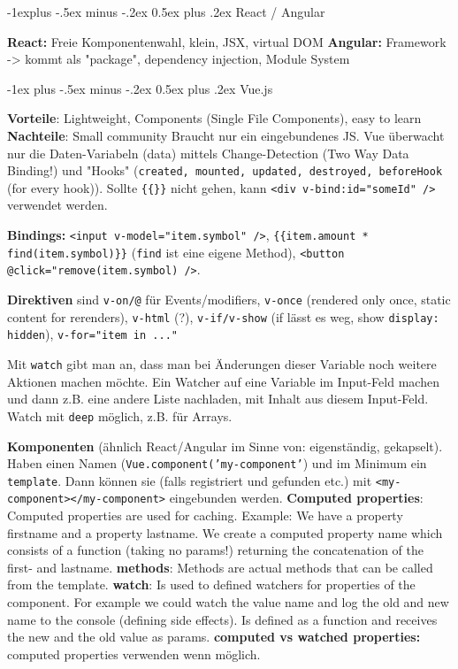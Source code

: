 \documentclass[a4paper, fontsize=6pt]{scrartcl}
\makeatletter
\renewcommand{\section}{\@startsection{section}{1}{0mm}%
    {-1ex plus -.5ex minus -.2ex}%
    {0.5ex plus .2ex}%
    {\normalfont\large\bfseries}}
\renewcommand{\subsection}{\@startsection{subsection}{2}{0mm}%
    {-1explus -.5ex minus -.2ex}%
    {0.5ex plus .2ex}%
    {\normalfont\normalsize\bfseries}}
\newcommand{\css}[1]{\texttt{#1}}
\newcommand{\html}[1]{\texttt{#1}}
\newcommand{\js}[1]{\texttt{#1}}
\makeatother
\begin{document}
\begin{multicols*}{5}
\subsection{React / Angular}

\textbf{React:} Freie Komponentenwahl, klein, JSX, virtual DOM
\textbf{Angular:} Framework -> kommt als "package", dependency injection, Module System

\section{Vue.js}

\textbf{Vorteile}: Lightweight, Components (Single File Components), easy to learn \textbf{Nachteile}: Small community
Braucht nur ein eingebundenes JS. Vue überwacht nur die Daten-Variabeln (data) mittels Change-Detection (Two Way Data Binding!) und "Hooks" (\js{created, mounted, updated, destroyed, beforeHook} (for every hook)). Sollte \html{\{\{\}\}} nicht gehen, kann \html{<div v-bind:id="someId" />} verwendet werden.

\textbf{Bindings:} \html{<input v-model="item.symbol" />}, \html{\{\{item.amount * find(item.symbol)\}\}} (\js{find} ist eine eigene Method), \html{<button @click="remove(item.symbol) />}.

\textbf{Direktiven} sind \html{v-on/@} für Events/modifiers, \html{v-once} (rendered only once, static content for rerenders), \html{v-html} (?), \html{v-if/v-show} (if lässt es weg, show \css{display: hidden}), \html{v-for="item in ..."}

Mit \js{watch} gibt man an, dass man bei Änderungen dieser Variable noch weitere Aktionen machen möchte. Ein Watcher auf eine Variable im Input-Feld machen und dann z.B. eine andere Liste nachladen, mit Inhalt aus diesem Input-Feld. Watch mit \js{deep} möglich, z.B. für Arrays.

\textbf{Komponenten} (ähnlich React/Angular im Sinne von: eigenständig, gekapselt). Haben einen Namen (\js{Vue.component('my-component'}) und im Minimum ein \js{template}. Dann können sie (falls registriert und gefunden etc.) mit \html{<my-component></my-component>} eingebunden werden.
\textbf{Computed properties}: Computed properties are used for caching. Example: We have a property firstname and a property lastname. We create a computed property name which consists of a function (taking no params!) returning the concatenation of the first- and lastname. 
\textbf{methods}: Methods are actual methods that can be called from the template.
\textbf{watch}: Is used to defined watchers for properties of the component. For example we could watch the value name and log the old and new name to the console (defining side effects). Is defined as a function and receives the new and the old value as params.
\textbf{computed vs watched properties:} computed properties verwenden wenn möglich. 


\end{multicols*}
\end{document}
